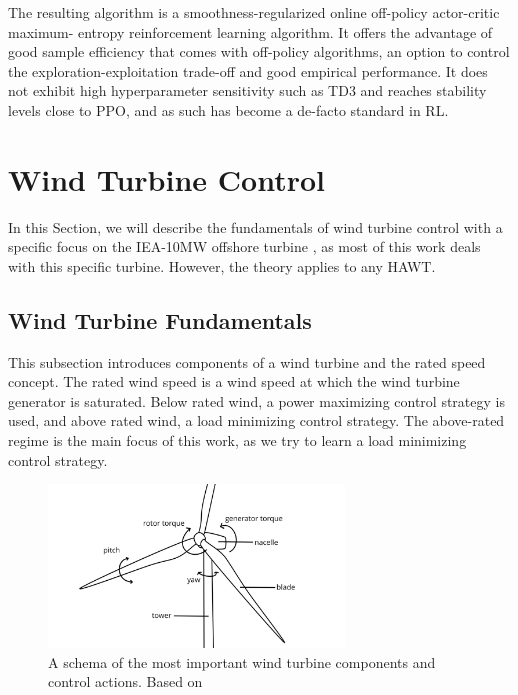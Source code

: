 The resulting algorithm is a smoothness-regularized online off-policy actor-critic maximum- entropy reinforcement learning algorithm. It offers the advantage of good sample efficiency that comes with off-policy algorithms, an option to control the exploration-exploitation trade-off and good empirical performance. It does not exhibit high hyperparameter sensitivity such as \ac{TD3} and reaches stability levels close to \ac{PPO}, and as such has become a de-facto standard in RL.

\section{Wind Turbine Control}
\label{section:background-wind-turbine-control}

\begin{summary}
In this Section, we will describe the fundamentals of wind turbine control with a specific focus on the IEA-10MW offshore turbine \cite{bortolottiIEAWindTCP2019}, as most of this work deals with this specific turbine. However, the theory applies to any \ac{HAWT}.
\end{summary}

\subsection{Wind Turbine Fundamentals}
\label{section:background-wind-turbine-fundamentals}

\begin{summary}
This subsection introduces components of a wind turbine and the rated speed concept. The rated wind speed is a wind speed at which the wind turbine generator is saturated. Below rated wind, a power maximizing control strategy is used, and above rated wind, a load minimizing control strategy. The above-rated regime is the main focus of this work, as we try to learn a load minimizing control strategy.
\end{summary}

\begin{figure}
  \centering
  \includegraphics[width=0.7\textwidth]{images/Windturbine-Schema.png}
  \caption{A schema of the most important wind turbine components and control actions. Based on \cite{openclipartWindTurbineSketch2017}}
  \label{fig:windturbine-schema}
\end{figure}

